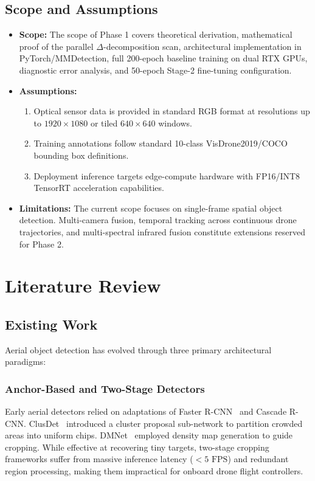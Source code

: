 \documentclass[12pt,a4paper]{report}
\begin{document}
\section{Scope and Assumptions}
\begin{itemize}[leftmargin=2em]
    \item \textbf{Scope:} The scope of Phase 1 covers theoretical derivation, mathematical proof of the parallel $\Delta$-decomposition scan, architectural implementation in PyTorch/MMDetection, full 200-epoch baseline training on dual RTX GPUs, diagnostic error analysis, and 50-epoch Stage-2 fine-tuning configuration.
    \item \textbf{Assumptions:} 
    \begin{enumerate}
        \item Optical sensor data is provided in standard RGB format at resolutions up to $1920 \times 1080$ or tiled $640 \times 640$ windows.
        \item Training annotations follow standard 10-class VisDrone2019/COCO bounding box definitions.
        \item Deployment inference targets edge-compute hardware with FP16/INT8 TensorRT acceleration capabilities.
    \end{enumerate}
    \item \textbf{Limitations:} The current scope focuses on single-frame spatial object detection. Multi-camera fusion, temporal tracking across continuous drone trajectories, and multi-spectral infrared fusion constitute extensions reserved for Phase 2.
\end{itemize}

\chapter{Literature Review}

\section{Existing Work}
Aerial object detection has evolved through three primary architectural paradigms:

\subsection{Anchor-Based and Two-Stage Detectors}
Early aerial detectors relied on adaptations of Faster R-CNN~\cite{ren2015faster} and Cascade R-CNN. ClusDet~\cite{yang2019clusdet} introduced a cluster proposal sub-network to partition crowded areas into uniform chips. DMNet~\cite{li2020density} employed density map generation to guide cropping. While effective at recovering tiny targets, two-stage cropping frameworks suffer from massive inference latency ($<5\text{ FPS}$) and redundant region processing, making them impractical for onboard drone flight controllers.
\end{document}
